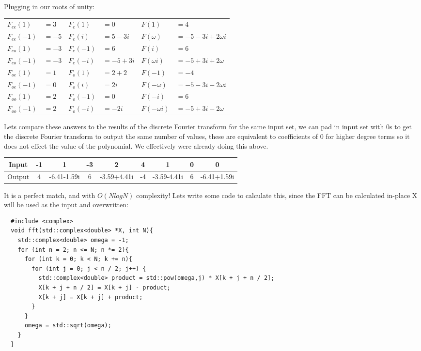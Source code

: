 \documentclass[12pt]{article}
\begin{document}
Plugging in our roots of unity:
\begin{center}
  \begin{tabular}{ll | ll | ll}
    $F_{ee}(1)$  & $= 3$  & $F_e(1)$  & $= 0$       & $F(1)$         & $= 4$                    \\
    $F_{ee}(-1)$ & $= -5$ & $F_e(i)$  & $= 5 - 3i$  & $F(\omega)$    & $= - 5 - 3i + 2\omega i$ \\
    $F_{eo}(1)$  & $= -3$ & $F_e(-1)$ & $= 6$       & $F(i)$         & $= 6$                    \\
    $F_{eo}(-1)$ & $= -3$ & $F_e(-i)$ & $= -5 + 3i$ & $F(\omega i)$  & $= - 5 + 3i + 2\omega$   \\
    $F_{oe}(1)$  & $= 1$  & $F_o(1)$  & $= 2 + 2$   & $F(-1)$        & $= -4$                   \\
    $F_{oe}(-1)$ & $= 0$  & $F_o(i)$  & $= 2i$      & $F(-\omega)$   & $= - 5 - 3i - 2\omega i$ \\
    $F_{oo}(1)$  & $= 2$  & $F_o(-1)$ & $= 0$       & $F(-i)$        & $= 6$                    \\
    $F_{oo}(-1)$ & $= 2$  & $F_o(-i)$ & $= -2i$     & $F(-\omega i)$ & $= - 5 + 3i - 2\omega$   \\
  \end{tabular}
\end{center}

Lets compare these answers to the results of the discrete Fourier transform for the same input set, we can pad in input set with 0s to get the discrete Fourier transform to output the same number of values, these are equivalent to coefficients of 0 for higher degree terms so it does not effect the value of the polynomial. We effectively were already doing this above.
\begin{center}
  \begin{tabular}{ |c|c|c|c|c|c|c|c|c| }
    \hline
    Input  & -1 & 1           & -3 & 2           & 4  & 1           & 0 & 0           \\
    \hline
    Output & 4  & -6.41-1.59i & 6  & -3.59+4.41i & -4 & -3.59-4.41i & 6 & -6.41+1.59i \\
    \hline
  \end{tabular}
\end{center}

It is a perfect match, and with $O(NlogN)$ complexity! Lets write some code to calculate this, since the FFT can be calculated in-place X will be used as the input and overwritten:
\begin{lstlisting}
  #include <complex>
  void fft(std::complex<double> *X, int N){
    std::complex<double> omega = -1;
    for (int n = 2; n <= N; n *= 2){
      for (int k = 0; k < N; k += n){
        for (int j = 0; j < n / 2; j++) {
          std::complex<double> product = std::pow(omega,j) * X[k + j + n / 2];
          X[k + j + n / 2] = X[k + j] - product;
          X[k + j] = X[k + j] + product;
        }
      }
      omega = std::sqrt(omega);
    }
  }
\end{lstlisting}
\end{document}
